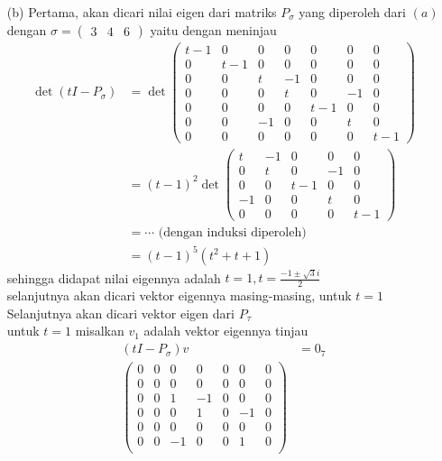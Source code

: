 \documentclass[11pt,a4paper]{article}
\theoremstyle{plain}
\theoremstyle{definition}
\theoremstyle{remark}
\begin{document}
\begin{enumerate}
\begin{enumerate}
\begin{enumerate}
	\item[(b)]
	Pertama, akan dicari nilai eigen dari matriks $P_{\sigma}$ yang diperoleh dari $(a)$ dengan $\sigma =\begin{pmatrix}
	3 & 4 & 6
	\end{pmatrix}$ yaitu dengan meninjau
	\begin{align*}
		\det(tI-P_{\sigma}) &= \det\begin{pmatrix}
		t-1 & 0 & 0 & 0 & 0 & 0 & 0\\ 
		0 & t-1 & 0 & 0 & 0 & 0 & 0\\ 
		0 & 0 & t & -1 & 0 & 0 & 0\\ 
		0 & 0 & 0 & t & 0 & -1 & 0\\ 
		0 & 0 & 0 & 0 & t-1 & 0 & 0\\ 
		0 & 0 & -1 & 0 & 0 & t & 0\\ 
		0 & 0 & 0 & 0 & 0 & 0 & t-1
		\end{pmatrix} \\
		&= 
		(t-1)^{2} \det\begin{pmatrix}
		t & -1 & 0 & 0 & 0\\ 
		0 & t & 0 & -1 & 0\\ 
		0 & 0 & t-1 & 0 & 0\\ 
		-1 & 0 & 0 & t & 0\\ 
		0 & 0 & 0 & 0 & t-1
		\end{pmatrix} \\
		&= \cdots \text{ (dengan induksi diperoleh)} \\
		&= (t-1)^{5}(t^2+t+1) 
	\end{align*}
	sehingga didapat nilai eigennya adalah $t=1, t=\frac{-1\pm \sqrt{3}i}{2}$\\
	selanjutnya akan dicari vektor eigennya masing-masing, untuk $t=1$ 
	Selanjutnya akan dicari vektor eigen dari $P_{\tau}$\\
	untuk $t=1$ misalkan $v_{1}$ adalah vektor eigennya tinjau\\
	\begin{align*}
	(tI-P_{\sigma})v&=0_{7} \\
	\begin{pmatrix}
	0 & 0 & 0 & 0 & 0 & 0 & 0\\ 
	0 & 0 & 0 & 0 & 0 & 0 & 0\\ 
	0 & 0 & 1 & -1 & 0 & 0 & 0\\ 
	0 & 0 & 0 & 1 & 0 & -1 & 0\\ 
	0 & 0 & 0 & 0 & 0 & 0 & 0\\ 
	0 & 0 & -1 & 0 & 0 & 1 & 0\\ 

\end{pmatrix}
\end{align*}
\end{enumerate}
\end{enumerate}
\end{enumerate}
\end{document}
